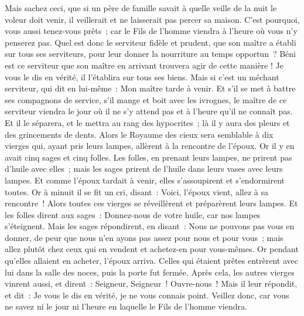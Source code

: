 \begin{multicols}{2}
Mais sachez ceci, que si un père de famille savait à quelle veille de la nuit le voleur doit venir, il veillerait et ne laisserait pas percer sa maison.
C'est pourquoi, vous aussi tenez-vous prêts~; car le Fils de l'homme viendra à l'heure où vous n'y penserez pas.
Quel est donc le serviteur fidèle et prudent, que son maître a établi sur tous ses serviteurs, pour leur donner la nourriture au temps opportun~?
Béni est ce serviteur que son maître en arrivant trouvera agir de cette manière !
Je vous le dis en vérité, il l'établira sur tous ses biens.
Mais si c'est un méchant serviteur, qui dit en lui-même~: Mon maître tarde à venir.
Et s'il se met à battre ses compagnons de service, s'il mange et boit avec les ivrognes,
le maître de ce serviteur viendra le jour où il ne s'y attend pas et à l'heure qu'il ne connaît pas.
Et il le séparera, et le mettra au rang des hypocrites~; là il y aura des pleurs et des grincements de dents.
\VerseOne{}Alors le Royaume des cieux sera semblable à dix vierges qui, ayant pris leurs lampes, allèrent à la rencontre de l'époux.
Or il y en avait cinq sages et cinq folles.
Les folles, en prenant leurs lampes, ne prirent pas d'huile avec elles~;
mais les sages prirent de l'huile dans leurs vases avec leurs lampes.
Et comme l'époux tardait à venir, elles s'assoupirent et s'endormirent toutes.
Or à minuit il se fit un cri, disant~: Voici, l'époux vient, allez à sa rencontre~!
Alors toutes ces vierges se réveillèrent et préparèrent leurs lampes.
Et les folles dirent aux sages~: Donnez-nous de votre huile, car nos lampes s'éteignent.
Mais les sages répondirent, en disant~: Nous ne pouvons pas vous en donner, de peur que nous n'en ayons pas assez pour nous et pour vous~; mais allez plutôt chez ceux qui en vendent et achetez-en pour vous-mêmes.
Or pendant qu'elles allaient en acheter, l'époux arriva. Celles qui étaient prêtes entrèrent avec lui dans la salle des noces, puis la porte fut fermée.
Après cela, les autres vierges vinrent aussi, et dirent~: Seigneur, Seigneur~! Ouvre-nous~!
Mais il leur répondit, et dit~: Je vous le dis en vérité, je ne vous connais point.
Veillez donc, car vous ne savez ni le jour ni l'heure en laquelle le Fils de l'homme viendra.

\end{multicols}
